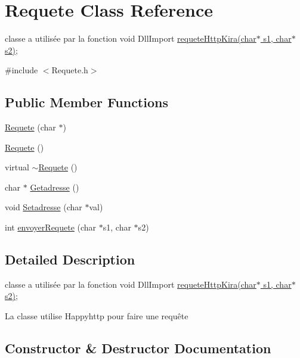\hypertarget{class_requete}{}\section{Requete Class Reference}
\label{class_requete}


classe a utilisée par la fonction void Dll\+Import \hyperlink{_requete_http_8h_aade1da46e511a08d213c2e2bc4533b43}{requete\+Http\+Kira(char$\ast$ s1, char$\ast$ s2)};  




{\ttfamily \#include $<$Requete.\+h$>$}

\subsection*{Public Member Functions}
\begin{DoxyCompactItemize}
\item 
\hyperlink{class_requete_a4a9a8fb9e4f9e13fd7a259d6e84292de}{Requete} (char $\ast$)
\item 
\hyperlink{class_requete_a54eff3029724ab41503df4ec6a83c4be}{Requete} ()
\item 
virtual \hyperlink{class_requete_a3e2bfd74cbf54959ae1eab8830dfdc2a}{$\sim$\+Requete} ()
\item 
char $\ast$ \hyperlink{class_requete_a0f587cad16a2d64db440a28a3595f6f2}{Getadresse} ()
\item 
void \hyperlink{class_requete_af9e04ef192428cbf0265a4e56ed123e0}{Setadresse} (char $\ast$val)
\item 
int \hyperlink{class_requete_af3eb4e9923bf1f557f291d0d12e35445}{envoyer\+Requete} (char $\ast$s1, char $\ast$s2)
\end{DoxyCompactItemize}


\subsection{Detailed Description}
classe a utilisée par la fonction void Dll\+Import \hyperlink{_requete_http_8h_aade1da46e511a08d213c2e2bc4533b43}{requete\+Http\+Kira(char$\ast$ s1, char$\ast$ s2)}; 

La classe utilise Happyhttp pour faire une requête 

\subsection{Constructor \& Destructor Documentation}
